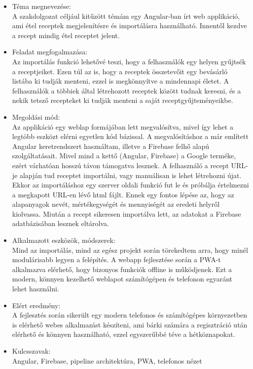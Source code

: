 \documentclass[12pt]{report}
\theoremstyle{definition}
\begin{document}
\begin{itemize}
	\item Téma  megnevezése: \\
	A szakdolgozat céljául kitűzött témám egy Angular-ban írt web applikáció, ami étel receptek megjelenítésre és importálásra használható. Innentől kezdve a recept mindig étel receptet jelent.
	\item Feladat  megfogalmazása: \\
	Az importálás funkció lehetővé teszi, hogy a felhasználók egy helyen gyűjtsék a receptjeiket. Ezen túl az is, hogy a receptek összetevőit egy bevásárló listába ki tudják menteni, ezzel is megkönnyítve a mindennapi életet. A felhasználók a többiek által létrehozott receptek között tudnak keresni, és a nekik tetsző recepteket ki tudják menteni a saját receptgyűjteményeikbe.
	\item Megoldási  mód: \\
	Az applikáció egy weblap formájában lett megvalósítva, mivel így lehet a legtöbb eszközt elérni egyetlen kód bázissal. A megvalósításhoz a már említett Angular keretrendszert használtam, illetve a Firebase felhő alapú szolgáltatásait. Mivel mind a kettő (Angular, Firebase) a Google terméke, ezért várhatóan hosszú távon támogatva lesznek. 
	A felhasználó a recept URL-je alapján tud receptet importálni, vagy manuálisan is lehet létrehozni újat. Ekkor az importáláshoz egy szerver oldali funkció fut le és próbálja értelmezni a megkapott URL-en lévő html fájlt. Ennek egy fontos lépése az, hogy az alapanyagok nevét, mértékegységét és mennyiségét az eredeti helyről kiolvassa. Miután a recept sikeresen importálva lett, az adatokat a Firebase adatbázisában lesznek eltárolva. 
	\item Alkalmazott  eszközök, módszerek: \\
	Mind az importálás, mind az egész projekt során törekedtem arra, hogy minél modulárisabb legyen a felépítés. A webapp fejlesztése során a PWA-t alkalmazva elérhető, hogy bizonyos funkciók offline is működjenek. Ezt a modern, könnyen kezelhető weblapot számítógépen és telefonon egyaránt lehet használni.
	\item Elért  eredmény: \\
	A fejlesztés során sikerült egy modern telefonos és számítógépes környezetben is elérhető webes alkalmazást készíteni, ami bárki számára a regisztráció után elérhető és könnyen használható, ezzel egyszerűbbé téve a hétköznapokat.
	\item Kulcsszavak: \\
	Angular, Firebase, pipeline architektúra, PWA, telefonos nézet
\end{itemize}
\end{document}
